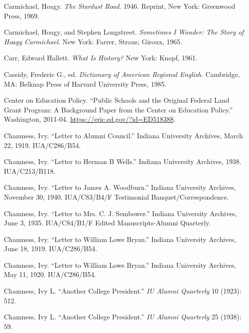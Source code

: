 \documentclass[
  american,
  letterpaper,
]{scrreprt}
\newlength{\cslhangindent}
\newenvironment{CSLReferences}[2] %
 {\begin{list}{}{%
  \setlength{\itemindent}{0pt}
  \setlength{\leftmargin}{0pt}
  \setlength{\parsep}{0pt}
  \ifodd #1
   \setlength{\leftmargin}{\cslhangindent}
   \setlength{\itemindent}{-1\cslhangindent}
  \fi
  \setlength{\itemsep}{#2\baselineskip}}}
 {\end{list}}
\begin{document}
\begin{CSLReferences}{1}{0}
Carmichael, Hoagy. \emph{The Stardust Road}. 1946. Reprint, New York:
Greenwood Press, 1969.

Carmichael, Hoagy, and Stephen Longstreet. \emph{Sometimes {I} Wonder:
The Story of Hoagy Carmichael}. New York: Farrer, Straus; Giroux, 1965.

Carr, Edward Hallett. \emph{What Is History?} New York: Knopf, 1961.

Cassidy, Frederic G., ed. \emph{Dictionary of American Regional
English}. Cambridge, MA: Belknap Press of Harvard University Press,
1985.

Center on Education Policy. {``Public Schools and the Original Federal
Land Grant Program: A Background Paper from the Center on Education
Policy.''} Washington, 2011-04. \url{https://eric.ed.gov/?id=ED518388}.

Chamness, Ivy. {``Letter to Alumni Council.''} Indiana University
Archives, March 22, 1919. IUA/C286/B54.

Chamness, Ivy. {``Letter to Herman {B} Wells.''} Indiana University
Archives, 1938. IUA/C213/B118.

Chamness, Ivy. {``Letter to James {A.} Woodburn.''} Indiana University
Archives, November 30, 1940. IUA/C83/B4/F Testimonial
Banquet/Correspondence.

Chamness, Ivy. {``Letter to Mrs. C. J. Sembower.''} Indiana University
Archives, June 3, 1935. IUA/C84/B1/F Edited Manuscripts-Alumni
Quarterly.

Chamness, Ivy. {``Letter to William Lowe Bryan.''} Indiana University
Archives, June 18, 1919. IUA/C286/B54.

Chamness, Ivy. {``Letter to William Lowe Bryan.''} Indiana University
Archives, May 11, 1920. IUA/C286/B54.

Chamness, Ivy L. {``Another College President.''} \emph{IU Alumni
Quarterly} 10 (1923): 512.

Chamness, Ivy L. {``Another College President.''} \emph{IU Alumni
Quarterly} 25 (1938): 59.


\end{CSLReferences}
\end{document}
